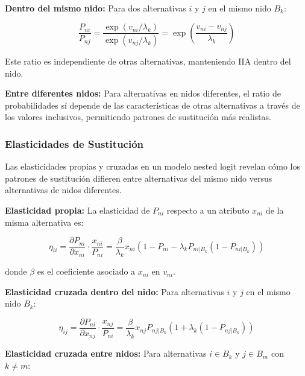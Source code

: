 \documentclass[
]{book}
\begin{document}
\textbf{Dentro del mismo nido:} Para dos alternativas \(i\) y \(j\) en el mismo nido \(B_k\):

\begin{equation}
\frac{P_{ni}}{P_{nj}} = \frac{\exp(v_{ni}/\lambda_k)}{\exp(v_{nj}/\lambda_k)} = \exp\left(\frac{v_{ni} - v_{nj}}{\lambda_k}\right)
\label{eq:ratiowithin}
\end{equation}

Este ratio es independiente de otras alternativas, manteniendo IIA dentro del nido.

\textbf{Entre diferentes nidos:} Para alternativas en nidos diferentes, el ratio de probabilidades sí depende de las características de otras alternativas a través de los valores inclusivos, permitiendo patrones de sustitución más realistas.

\subsubsection{Elasticidades de Sustitución}\label{elasticidades-de-sustituciuxf3n}

Las elasticidades propias y cruzadas en un modelo nested logit revelan cómo los patrones de sustitución difieren entre alternativas del mismo nido versus alternativas de nidos diferentes.

\textbf{Elasticidad propia:} La elasticidad de \(P_{ni}\) respecto a un atributo \(x_{ni}\) de la misma alternativa es:

\begin{equation}
\eta_{ii} = \frac{\partial P_{ni}}{\partial x_{ni}} \cdot \frac{x_{ni}}{P_{ni}} = \frac{\beta}{\lambda_k} x_{ni} \left(1 - P_{ni} - \lambda_k P_{ni|B_k}(1 - P_{ni|B_k})\right)
\label{eq:elastown}
\end{equation}

donde \(\beta\) es el coeficiente asociado a \(x_{ni}\) en \(v_{ni}\).

\textbf{Elasticidad cruzada dentro del nido:} Para alternativas \(i\) y \(j\) en el mismo nido \(B_k\):

\begin{equation}
\eta_{ij} = \frac{\partial P_{ni}}{\partial x_{nj}} \cdot \frac{x_{nj}}{P_{ni}} = \frac{\beta}{\lambda_k} x_{nj} P_{nj|B_k}(1 + \lambda_k(1 - P_{nj|B_k}))
\label{eq:elastwithin}
\end{equation}

\textbf{Elasticidad cruzada entre nidos:} Para alternativas \(i \in B_k\) y \(j \in B_m\) con \(k \neq m\):
\end{document}
